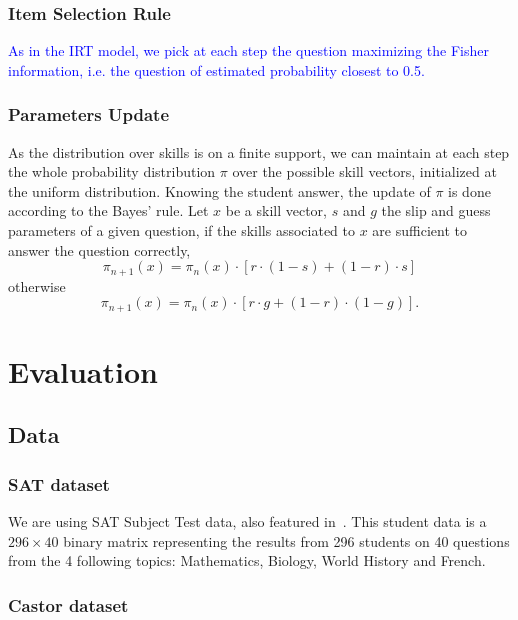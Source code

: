 \documentclass{sig-alternate}
\newcommand\note[1]{\textcolor{blue}{#1}}
\begin{document}
\subsubsection{Item Selection Rule}

\note{As in the IRT model, we pick at each step the question maximizing the Fisher information, i.e. the question of estimated probability closest to 0.5.}

\subsubsection{Parameters Update}

As the distribution over skills is on a finite support, we can maintain at each step the whole probability distribution $\pi$ over the possible skill vectors, initialized at the uniform distribution.
Knowing the student answer, the update of $\pi$ is done according to the Bayes' rule. Let $x$ be a skill vector, $s$ and $g$ the slip and guess parameters of a given question, if the skills associated to $x$ are sufficient to answer the question correctly,
\[ \pi_{n+1}(x) = \pi_n(x) \cdot [r\cdot(1-s) + (1-r)\cdot s] \]
otherwise
\[ \pi_{n+1}(x) = \pi_n(x) \cdot [r\cdot g + (1-r)\cdot(1-g)]. \]

\section{Evaluation}

\subsection{Data} %

\subsubsection{SAT dataset}

We are using SAT Subject Test data, also featured in~\citep{Winters2005, Desmarais2011}. This student data is a $296 \times 40$ binary matrix representing the results from 296 students on 40 questions from the 4 following topics: Mathematics, Biology, World History and French.

\subsubsection{Castor dataset}
\end{document}
